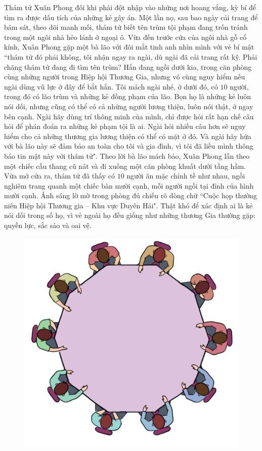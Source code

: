 \centering
\endgroup
\vspace*{55pt} 
\begin{multicols}{2}
	Thám tử Xuân Phong đôi khi phải đột nhập vào những nơi hoang vắng, kỳ bí để tìm ra được dấu tích của những kẻ gây án. Một lần nọ, sau bao ngày cải trang để bám sát, theo dõi manh mối, thám tử biết tên trùm tội phạm đang trốn tránh trong một ngôi nhà hẻo lánh ở ngoại ô. Vừa đến trước cửa của ngôi nhà gỗ cổ kính, Xuân Phong gặp một bà lão với đôi mắt tinh anh nhìn mình với vẻ bí mật ``thám tử đó phải không, tôi nhận ngay ra ngài, dù ngài đã cải trang rất kỹ. Phải chăng thám tử đang đi tìm tên trùm? Hắn đang ngồi dưới kia, trong căn phòng cùng những người trong Hiệp hội Thương Gia, nhưng vô cùng nguy hiểm nếu ngài dùng vũ lực ở đây để bắt hắn. Tôi mách ngài nhé, ở dưới đó, có $10$ người, trong đó có lão trùm và những kẻ đồng phạm của lão. Bọn họ là những kẻ luôn nói dối, nhưng cũng có thể có cả những người lương thiện, luôn nói thật, ở ngay bên cạnh. Ngài hãy dùng trí thông minh của mình, chỉ được hỏi rất hạn chế câu hỏi để phán đoán ra những kẻ phạm tội là ai. Ngài hỏi nhiều câu hơn sẽ nguy hiểm cho cả những thương gia lương thiện có thể có mặt ở đó. Và ngài hãy hứa với bà lão này sẽ đảm bảo an toàn cho tôi và gia đình, vì tôi đã liều mình thông báo tin mật này với thám tử".
	\vskip 0.1cm
	Theo lời bà lão mách bảo, Xuân Phong lần theo một chiếc cầu thang cũ nát và đi xuống một căn phòng khuất dưới tầng hầm. Vừa mở cửa ra, thám tử đã thấy có $10$ người ăn mặc chỉnh tề như nhau, ngồi nghiêm trang quanh một chiếc bàn mười cạnh, mỗi người ngồi tại đỉnh của hình mười cạnh. Ánh sáng lờ mờ trong phòng đủ chiếu rõ dòng chữ ``Cuộc họp thường niên Hiệp hội Thương gia -- Khu vực Duyên Hải". Thật khó để xác định ai là kẻ nói dối trong số họ, vì vẻ ngoài họ đều giống như những thương Gia thường gặp: quyền lực, sắc sảo và oai vệ.
	\begin{figure}[H]
		\centering
		\vspace*{-5pt}
		\captionsetup{labelformat= empty, justification=centering}
		\includegraphics[width=1\linewidth]{xp}

\end{figure}
\end{multicols}
